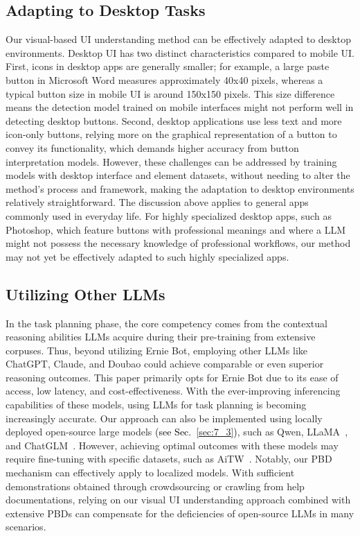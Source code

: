 \subsection{Adapting to Desktop Tasks}
Our visual-based UI understanding method can be effectively adapted to desktop environments. Desktop UI has two distinct characteristics compared to mobile UI. First, icons in desktop apps are generally smaller; for example, a large paste button in Microsoft Word measures approximately 40x40 pixels, whereas a typical button size in mobile UI is around 150x150 pixels. This size difference means the detection model trained on mobile interfaces might not perform well in detecting desktop buttons. Second, desktop applications use less text and more icon-only buttons, relying more on the graphical representation of a button to convey its functionality, which demands higher accuracy from button interpretation models. However, these challenges can be addressed by training models with desktop interface and element datasets, without needing to alter the method's process and framework, making the adaptation to desktop environments relatively straightforward. The discussion above applies to general apps commonly used in everyday life. For highly specialized desktop apps, such as Photoshop, which feature buttons with professional meanings and where a LLM might not possess the necessary knowledge of professional workflows, our method may not yet be effectively adapted to such highly specialized apps.

\subsection{Utilizing Other LLMs}
In the task planning phase, the core competency comes from the contextual reasoning abilities LLMs acquire during their pre-training from extensive corpuses. Thus, beyond utilizing Ernie Bot, employing other LLMs like ChatGPT, Claude, and Doubao could achieve comparable or even superior reasoning outcomes. This paper primarily opts for Ernie Bot due to its ease of access, low latency, and cost-effectiveness. With the ever-improving inferencing capabilities of these models, using LLMs for task planning is becoming increasingly accurate. Our approach can also be implemented using locally deployed open-source large models \textcolor{black}{(see Sec.~\ref{sec:7_3})}, such as Qwen, LLaMA~\cite{touvron2023llama}, and ChatGLM~\cite{du2022glm}. However, achieving optimal outcomes with these models may require fine-tuning with specific datasets, such as AiTW~\cite{rawles2023androidinthewild}. Notably, our PBD mechanism can effectively apply to localized models. With sufficient demonstrations obtained through crowdsourcing or crawling from help documentations, relying on our visual UI understanding approach combined with extensive PBDs can compensate for the deficiencies of open-source LLMs in many scenarios.

